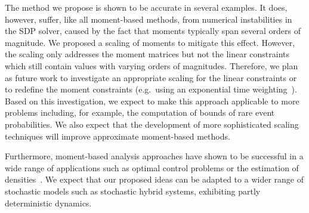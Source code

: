 The method we propose is shown to be accurate in several examples. It does, however, suffer, like all moment-based methods, from numerical instabilities in the \ac{SDP} solver, caused by the fact that moments typically span several orders of magnitude. We proposed a scaling of moments to mitigate this effect. 
However, the scaling only addresses the moment matrices but not the linear constraints
which still contain values with varying orders of magnitudes.
Therefore, we plan as future work to investigate an appropriate scaling for the linear constraints
or to redefine the moment
constraints (e.g.\ using an exponential time weighting~\parencite{dowdy2018dynamic}).
Based on this investigation, we expect to make this approach applicable to
more problems including, for example, the computation of bounds of rare event probabilities.
We also expect that the development of more sophisticated scaling techniques will  improve approximate moment-based methods.

Furthermore, moment-based analysis approaches have shown to be successful
in a wide range of applications such as optimal control problems or the estimation
of densities~\parencite{lasserre2010moments}.
We expect that our proposed ideas   can be adapted to a wider range
of stochastic models such as stochastic hybrid systems, exhibiting partly deterministic dynamics.


